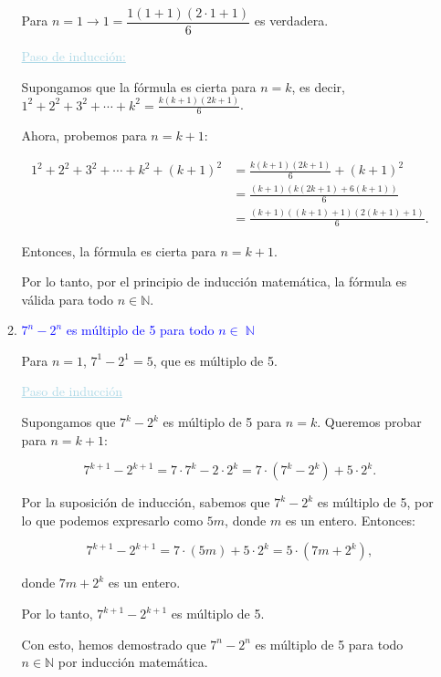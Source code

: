 \documentclass{article}
\newcommand{\bu}[1]{\textcolor{lightblue}{\underline{#1}}}
\newcommand{\db}[1]{\textcolor{blue}{#1}}
\DeclareMathOperator{\N}{\mathbb{N}}
\begin{document}
\begin{enumerate}[label=\color{red}\textbf{\arabic*)},leftmargin=*]
\begin{enumerate}[label=\color{red}\alph*)]
      	Para $n=1\longrightarrow 1=\dfrac{1(1+1)(2\cdot 1+1)}{6}$ es verdadera.
      	
      	\bu{Paso de inducción:}
      	
      	Supongamos que la fórmula es cierta para \(n = k\), es decir, \(1^2+2^2+3^2+\cdots+k^2 = \frac{k(k+1)(2k+1)}{6}\).
      	
      	Ahora, probemos para \(n = k + 1\):

      	\begin{align*}
      		1^2+2^2+3^2+\cdots+k^2+(k+1)^2 &= \frac{k(k+1)(2k+1)}{6} + (k+1)^2 \\
      		&= \frac{(k+1)(k(2k+1) + 6(k+1))}{6} \\
      		&= \frac{(k+1)((k+1)+1)(2(k+1)+1)}{6}.
      	\end{align*}

      	Entonces, la fórmula es cierta para \(n = k + 1\).
      	
      	Por lo tanto, por el principio de inducción matemática, la fórmula es válida para todo \(n \in \mathbb{N}\).
      	\item \db{$7^n-2^n$ es múltiplo de 5 para todo $n\in\N$} 
      	
      	Para \(n = 1\), \(7^1 - 2^1 = 5\), que es múltiplo de 5.
      	
      	\bu{Paso de inducción}
      	
      	Supongamos que \(7^k - 2^k\) es múltiplo de 5 para \(n = k\). Queremos probar para \(n = k + 1\):
      	
      	
      	\[7^{k+1} - 2^{k+1} = 7 \cdot 7^k - 2 \cdot 2^k = 7 \cdot (7^k - 2^k) + 5 \cdot 2^k.\]
      	
      	Por la suposición de inducción, sabemos que \(7^k - 2^k\) es múltiplo de 5, por lo que podemos expresarlo como \(5m\), donde \(m\) es un entero. Entonces:
      	
      	\[7^{k+1} - 2^{k+1} = 7 \cdot (5m) + 5 \cdot 2^k = 5 \cdot (7m + 2^k),\]
      	
      	donde \(7m + 2^k\) es un entero.
      	
      	Por lo tanto, \(7^{k+1} - 2^{k+1}\) es múltiplo de 5.
      	
      	Con esto, hemos demostrado que \(7^n - 2^n\) es múltiplo de 5 para todo \(n \in \mathbb{N}\) por inducción matemática.
      	

\end{enumerate}
\end{enumerate}
\end{document}
